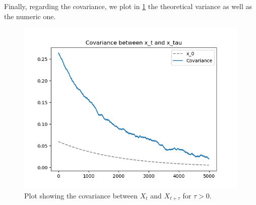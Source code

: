 \documentclass[a4paper,12pt]{article} %
\begin{document}
Finally, regarding the covariance, we plot in \ref{fig:covariance} the theoretical variance as well as the numeric one.


\begin{figure}[h!]
    \centering
    \includegraphics[width=1\textwidth]{plots/covariance.png} %
    \caption{Plot showing the covariance between \(X_t\) and \(X_{t+\tau } \) for \(\tau >0\).}
    \label{fig:covariance}
\end{figure}
\end{document}
